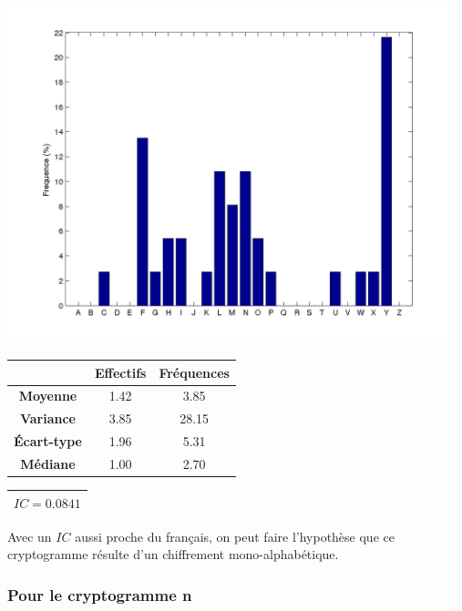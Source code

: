 \documentclass[a4paper, titlepage]{livret}
\begin{document}
\begin{minipage}[c]{.85\linewidth}\centering
\includegraphics[width=13cm]{img/LettreFreqCesar.png}
\label{fig2}
\end{minipage} \hfill

\begin{center}
\begin{tabular}{|c|c|c|}
	\hline
	& \textbf{Effectifs} & \textbf{Fréquences}\\
	\hline
	\textbf{Moyenne} &    1.42 &  3.85\\
	\hline
	\textbf{Variance} &    3.85 &  28.15\\
	\hline
	\textbf{Écart-type} &    1.96 &  5.31\\
	\hline
	\textbf{Médiane} &    1.00 &  2.70\\
	\hline
\end{tabular}
\label{tab9}
\end{center}

\begin{center}
\begin{tabular}{|c|}
\hline
\textbf{$IC = 0.0841$}\\
\hline
\end{tabular}
\label{tab10}
\end{center}

Avec un $IC$ aussi proche du français, on peut faire l'hypothèse que ce cryptogramme résulte d'un chiffrement mono-alphabétique.

\subsubsection{Pour le cryptogramme n}
\end{document}
